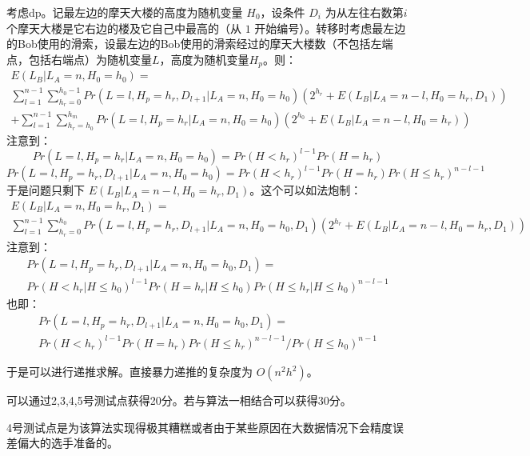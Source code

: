 \documentclass[11pt, a4paper]{article}
\begin{document}
考虑dp。记最左边的摩天大楼的高度为随机变量 $H_0$，设条件 $D_i$ 为从左往右数第$i$个摩天大楼是它右边的楼及它自己中最高的（从 $1$ 开始编号）。转移时考虑最左边的Bob使用的滑索，设最左边的Bob使用的滑索经过的摩天大楼数（不包括左端点，包括右端点）为随机变量$L$，高度为随机变量$H_p$。则：
\begin{multline}
E(L_B | L_A = n, H_0 = h_0) = \\
\sum_{l = 1}^{n - 1}\sum_{h_r = 0}^{h_0 - 1}{Pr(L = l, H_p = h_r, D_{l + 1} | L_A = n, H_0 = h_0) \left(2^{h_r} + E(L_B | L_A = n - l, H_0 = h_r, D_1)\right)}\\
+ \sum_{l = 1}^{n - 1}\sum_{h_r = h_0}^{h_m}{Pr(L = l, H_p = h_r | L_A = n, H_0 = h_0) \left(2^{h_0} + E(L_B | L_A = n - l, H_0 = h_r) \right)}
\end{multline}
注意到：
\begin{equation}
Pr(L = l, H_p = h_r | L_A = n, H_0 = h_0) = Pr(H < h_r)^{l - 1} Pr(H = h_r)
\end{equation}
\begin{equation}
Pr(L = l, H_p = h_r, D_{l + 1} | L_A = n, H_0 = h_0) = Pr(H < h_r)^{l - 1} Pr(H = h_r) Pr(H \leq h_r)^{n - l - 1}
\end{equation}
于是问题只剩下 $E(L_B | L_A = n - l, H_0 = h_r, D_1)$。这个可以如法炮制：
\begin{multline}
E(L_B | L_A = n, H_0 = h_r, D_1) = \\
\sum_{l = 1}^{n - 1}\sum_{h_r = 0}^{h_0}{Pr(L = l, H_p = h_r, D_{l + 1} | L_A = n, H_0 = h_0, D_1) \left(2^{h_r} + E(L_B | L_A = n - l, H_0 = h_r, D_1)\right)}
\end{multline}
注意到：
\begin{multline}
Pr(L = l, H_p = h_r, D_{l + 1} | L_A = n, H_0 = h_0, D_1) = \\
Pr(H < h_r | H \leq h_0)^{l - 1} Pr(H = h_r | H \leq h_0) Pr(H \leq h_r | H \leq h_0)^{n - l - 1}
\end{multline}
也即：
\begin{multline}
Pr(L = l, H_p = h_r, D_{l + 1} | L_A = n, H_0 = h_0, D_1) = \\
Pr(H < h_r)^{l - 1} Pr(H = h_r) Pr(H \leq h_r)^{n - l - 1} / Pr(H \leq h_0)^{n - 1}
\end{multline}

于是可以进行递推求解。直接暴力递推的复杂度为 $O(n^2h^2)$。

可以通过2,3,4,5号测试点获得20分。若与算法一相结合可以获得30分。

4号测试点是为该算法实现得极其糟糕或者由于某些原因在大数据情况下会精度误差偏大的选手准备的。
\end{document}
